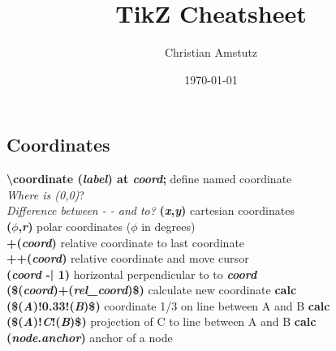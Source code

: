 \documentclass[10pt]{article}
\title{TikZ Cheatsheet}
\author{Christian Amstutz}
\date{\today}
\newcommand{\tikzcmd}[1]{\textbf{#1}}
\newcommand{\tikzparam}[1]{\textbf{\emph{#1}}}
\newcommand{\tikzlib}[1]{\textbf{#1}}
\begin{document}
    \maketitle

    \begin{multicols}{2}

        \section{Coordinates}
        \tikzcmd{\textbackslash coordinate (\tikzparam{label}) at \tikzparam{coord};} define named coordinate\\
        \emph{Where is (0,0)}?\\
        \emph{Difference between - - and to?}
        \tikzcmd{(\tikzparam{x},\tikzparam{y})} cartesian coordinates\\
        \tikzcmd{(\tikzparam{$\phi$},\tikzparam{r})} polar coordinates ($\phi$ in degrees)\\
        \tikzcmd{+(\tikzparam{coord})} relative coordinate to last coordinate\\
        \tikzcmd{++(\tikzparam{coord})} relative coordinate and move cursor\\
        \tikzcmd{(\tikzparam{coord} -| 1)} horizontal perpendicular to to \tikzparam{coord}\\
        \tikzcmd{(\$(\tikzparam{coord})+(\tikzparam{rel\_coord})\$)} calculate new coordinate \tikzlib{calc}\\
        \tikzcmd{(\$(\tikzparam{A})!0.33!(\tikzparam{B})\$)} coordinate 1/3 on line between A and B \tikzlib{calc}\\
        \tikzcmd{(\$(\tikzparam{A})!\tikzparam{C}!(\tikzparam{B})\$)} projection of C to line between A and B \tikzlib{calc}\\
        \tikzcmd{(\tikzparam{node}.\tikzparam{anchor})} anchor of a node


\end{multicols}
\end{document}
